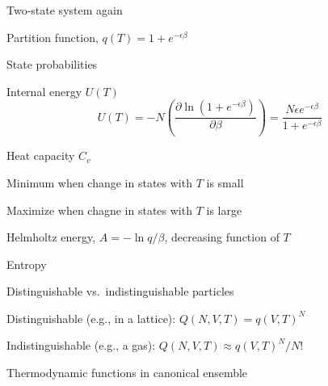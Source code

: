 \documentclass[11pt]{article}
\begin{document}
\begin{outline}
\begin{outline}
    \item Two-state system again
      \begin{outline}
      \item Partition function, $q(T)=1+e^{-\epsilon\beta}$
      \item State probabilities
      \item{Internal energy $U(T)$}
        \begin{equation}
          U(T)=-N \left ( \frac{\partial \ln(1+e^{-\epsilon\beta})}{\partial\beta}
          \right)=\frac{N\epsilon e^{-\epsilon\beta}}{1+e^{-\epsilon\beta}}
        \end{equation}
     \item Heat capacity $C_v$
        \begin{outline}
        \item Minimum when change in states with $T$ is small
        \item Maximize when chagne in states with $T$ is large
        \end{outline}
      \item Helmholtz energy, $A= -\ln q/\beta$, decreasing function of $T$
      \item Entropy
      \end{outline}
    \item Distinguishable vs.\ indistinguishable particles
      \begin{outline}
      \item Distinguishable (e.g., in a lattice): $Q(N,V,T) = q(V,T)^N$
      \item Indistinguishable (e.g., a gas): $Q(N,V,T)\approx q(V,T)^N/N!$
      \end{outline}
      \item Thermodynamic functions in canonical ensemble
    \end{outline}


\end{outline}
\end{document}
